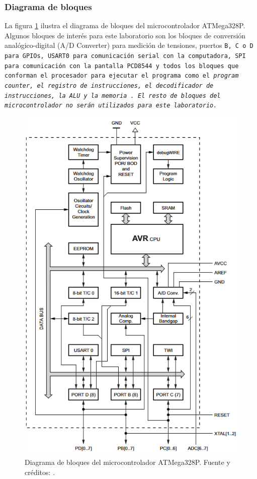 \subsubsection{Diagrama de bloques}
La figura \ref{mcu-diagram} ilustra el diagrama de bloques del microcontrolador ATMega328P. Algunos bloques de interés para este laboratorio son los bloques 
de conversión analógico-digital (A/D Converter) para medición de tensiones, puertos \tt{B}, \tt{C} o \tt{D} para GPIOs, USART0 para comunicación serial con la computadora, SPI para comunicación con la pantalla PCD8544 y todos los bloques que conforman el procesador para ejecutar el programa como el \it{program counter}, el registro de instrucciones, el decodificador de instrucciones, la ALU y la memoria \cite{datasheet, atmega}. El resto de bloques del microcontrolador no serán utilizados para este laboratorio.
\begin{figure}[H]
    \centering
    \includegraphics[width=14cm]{Imagenes/mcu-diagram.png}
    \caption{Diagrama de bloques del microcontrolador ATMega328P. Fuente y créditos: \cite{atmega}.}
    \label{mcu-diagram}
\end{figure}


